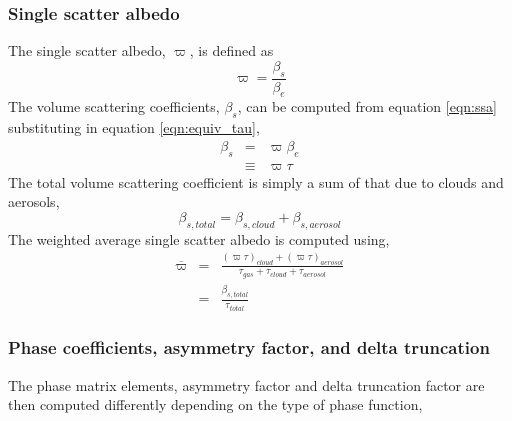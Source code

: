 \subsubsection{Single scatter albedo}
The single scatter albedo, $\varpi$, is defined as
\begin{equation}
  \varpi = \frac{\beta_s}{\beta_e}
  \label{eqn:ssa}
\end{equation}
The volume scattering coefficients, $\beta_s$, can be computed from equation \ref{eqn:ssa} substituting in equation \ref{eqn:equiv_tau},
\begin{eqnarray}
  \beta_s &=     & \varpi \beta_e \nonumber\\
          &\equiv& \varpi \tau
\end{eqnarray}
The total volume scattering coefficient is simply a sum of that due to clouds and aerosols,
\begin{equation}
  \beta_{s,total} = \beta_{s,cloud} + \beta_{s,aerosol}
\end{equation}
The weighted average single scatter albedo is computed using,
\begin{eqnarray}
  \overline{\varpi} &=& \frac{(\varpi\tau)_{cloud} + (\varpi\tau)_{aerosol}}{\tau_{gas} + \tau_{cloud} + \tau_{aerosol}}\nonumber\\
                    &=& \frac{\beta_{s,total}}{\tau_{total}}
\end{eqnarray}


\subsubsection{Phase coefficients, asymmetry factor, and delta truncation}
The phase matrix elements, asymmetry factor and delta truncation factor are then computed differently depending on the type of phase function,\vspace{1em}

